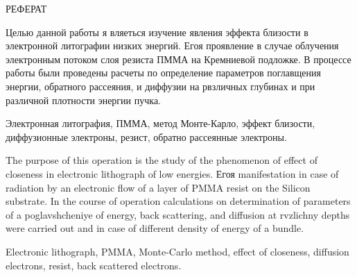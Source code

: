 \begin{center}
РЕФЕРАТ
\end{center}

Целью данной работы я вляеться изучение явления эффекта близости в электронной литографии низких энергий.
Егоя проявление в случае облучения электронным потоком слоя резиста ПММА на Кремниевой подложке. В процессе работы были проведены расчеты по определение параметров поглавщения энергии, обратного рассеяния, и диффузии на рвзличных глубинах и при различной плотности энергии пучка.
\vspace*{1cm}

Электронная литография, ПММА, метод Монте-Карло, эффект близости, диффузионные электроны, резист, обратно рассеянные электроны.
 \vspace*{1cm}

The purpose of this operation is the study of the phenomenon of effect of closeness in electronic lithograph of low energies.
Егоя manifestation in case of radiation by an electronic flow of a layer of PMMA resist on the Silicon substrate. In the course of operation calculations on determination of parameters of a poglavshcheniye of energy, back scattering, and diffusion at rvzlichny depths were carried out and in case of different density of energy of a bundle.
\vspace*{1cm}

Electronic lithograph, PMMA, Monte-Carlo method, effect of closeness, diffusion electrons, resist, back scattered electrons.

